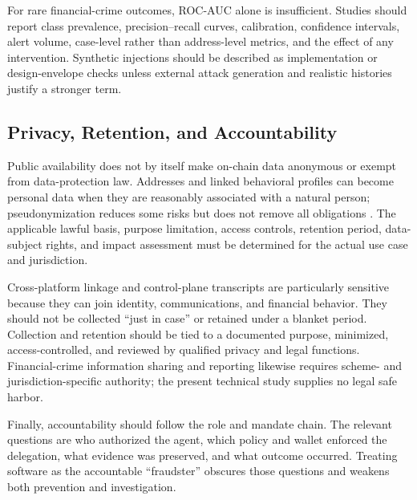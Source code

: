 For rare financial-crime outcomes, ROC-AUC alone is insufficient.  Studies
should report class prevalence, precision--recall curves, calibration,
confidence intervals, alert volume, case-level rather than address-level
metrics, and the effect of any intervention.  Synthetic injections should be
described as implementation or design-envelope checks unless external attack
generation and realistic histories justify a stronger term.

\subsection{Privacy, Retention, and Accountability}\label{subsec:privacy}

Public availability does not by itself make on-chain data anonymous or exempt
from data-protection law.  Addresses and linked behavioral profiles can become
personal data when they are reasonably associated with a natural person;
pseudonymization reduces some risks but does not remove all obligations
\cite{gdpr2016,ccpa2018}.  The applicable lawful basis, purpose limitation,
access controls, retention period, data-subject rights, and impact assessment
must be determined for the actual use case and jurisdiction.

Cross-platform linkage and control-plane transcripts are particularly
sensitive because they can join identity, communications, and financial
behavior.  They should not be collected ``just in case'' or retained under a
blanket period.  Collection and retention should be tied to a documented
purpose, minimized, access-controlled, and reviewed by qualified privacy and
legal functions.  Financial-crime information sharing and reporting likewise
requires scheme- and jurisdiction-specific authority; the present technical
study supplies no legal safe harbor.

Finally, accountability should follow the role and mandate chain.  The relevant
questions are who authorized the agent, which policy and wallet enforced the
delegation, what evidence was preserved, and what outcome occurred.  Treating
software as the accountable ``fraudster'' obscures those questions and weakens
both prevention and investigation.
